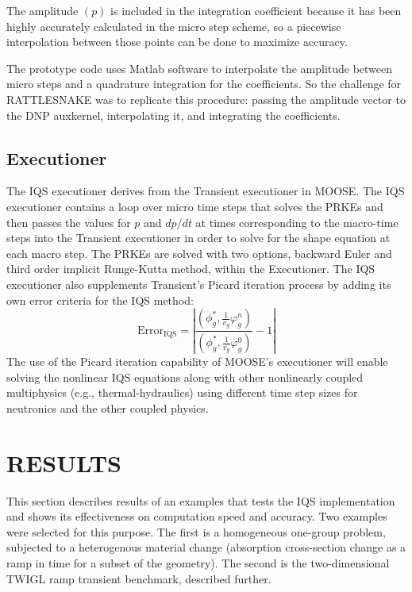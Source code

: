 \documentclass[12pt]{article}
\newcommand{\be}{\begin{equation}}
\newcommand{\ee}{\end{equation}}
\begin{document}
The amplitude $(p)$ is included in the integration coefficient because it has been highly accurately calculated in the micro step scheme, so a piecewise interpolation between those points can be done to maximize accuracy.  

The prototype code uses Matlab software to interpolate the amplitude between micro steps and a quadrature integration for the coefficients.  So the challenge for RATTLESNAKE was to replicate this procedure: passing the amplitude vector to the DNP auxkernel, interpolating it, and integrating the coefficients. 


\subsection{Executioner}

The IQS executioner derives from the Transient executioner in MOOSE.  The IQS executioner contains a loop over micro time steps that solves the PRKEs and then passes the values for $p$ and $dp/dt$ at times corresponding to the macro-time steps into the Transient executioner in order to solve for the shape equation at each macro step.  The PRKEs are solved with two options, backward Euler and third order implicit Runge-Kutta method, within the Executioner.  The IQS executioner also supplements Transient's Picard iteration process by adding its own error criteria for the IQS method: 
\be
\text{Error}_{\text{IQS}}=\left|\frac{\left(\phi^*_g,\frac{1}{v_g}\varphi_g^n\right)}{\left(\phi_g^*,\frac{1}{v_g}\varphi_g^0\right)}-1\right|
\ee
The use of the Picard iteration capability of MOOSE's executioner will enable solving the nonlinear IQS equations along with other nonlinearly coupled multiphysics (e.g., thermal-hydraulics) using different time step sizes for neutronics and the other coupled physics. 


%
\section{RESULTS} 
\label{sect::results}

This section describes results of an examples that tests the IQS implementation and shows its effectiveness on computation speed and accuracy.  Two examples were selected for this purpose.  The first is a homogeneous one-group problem, subjected to a heterogenous material change (absorption cross-section change as a ramp in time for a subset of the geometry).  The second is the two-dimensional TWIGL ramp transient benchmark, described further.
\end{document}
